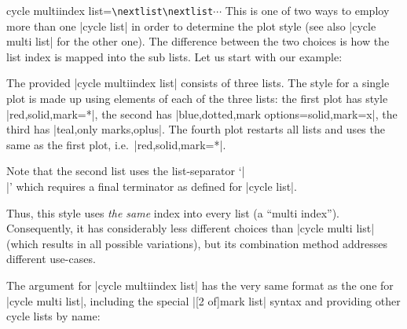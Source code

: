 \begin{pgfplotskey}{cycle multiindex list=\texttt{\textbackslash nextlist}\texttt{\textbackslash nextlist}$\dotsb$}
	This is one of two ways to employ more than one |cycle list| in order to determine the plot style (see also |cycle multi list| for the other one). The difference between the two choices is how the list index is mapped into the sub lists. Let us start with our example:
\begin{codeexample}[]
\end{codeexample}
	\noindent The provided |cycle multiindex list| consists of three lists. The style for a single plot is made up using elements of each of the three lists: the first plot has style |red,solid,mark=*|, the second has |blue,dotted,mark options={solid},mark=x|, the third has |teal,only marks,oplus|. The fourth plot restarts all lists and uses the same as the first plot, i.e.\ |red,solid,mark=*|. 
	
	Note that the second list uses the list-separator `|\\|' which requires a final terminator as defined for |cycle list|.

	Thus, this style uses \emph{the same} index into every list (a ``multi index''). Consequently, it has considerably less different choices than |cycle multi list| (which results in all possible variations), but its combination method addresses different use-cases.
	
	The argument for |cycle multiindex list| has the very same format as the one for |cycle multi list|, including the special |[2 of]mark list| syntax and providing other cycle lists by name:


\end{pgfplotskey}
